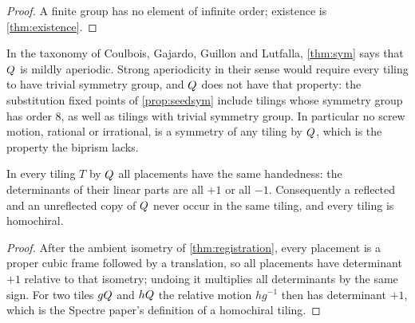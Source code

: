 
\begin{proof}
A finite group has no element of infinite order; existence is \cref{thm:existence}.
\end{proof}

In the taxonomy of Coulbois, Gajardo, Guillon and Lutfalla, \cref{thm:sym} says that $Q$
is mildly aperiodic. Strong aperiodicity in their sense would require every tiling to have
trivial symmetry group, and $Q$ does not have that property: the substitution fixed points
of \cref{prop:seedsym} include tilings whose symmetry group has order $8$, as well as tilings
with trivial symmetry group. In particular no screw motion, rational or
irrational, is a symmetry of any tiling by $Q$, which is the property the biprism lacks.

\begin{theorem}\label{thm:homochiral}
In every tiling $T$ by $Q$ all placements have the same handedness: the determinants of
their linear parts are all $+1$ or all $-1$. Consequently a reflected and an unreflected copy of
$Q$ never occur in the same tiling, and every tiling is homochiral.
\end{theorem}

\begin{proof}
After the ambient isometry of \cref{thm:registration}, every placement is a proper cubic frame
followed by a translation, so all placements have determinant $+1$ relative to that isometry;
undoing it multiplies all determinants by the same sign. For two tiles $gQ$ and $hQ$
the relative motion $hg^{-1}$ then has determinant $+1$, which is the Spectre paper's definition
of a homochiral tiling.
\end{proof}



